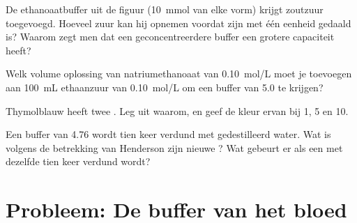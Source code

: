 \begin{exercise}[$\star\star\star$]\label{exo:g12:buffers-predominance:12}
De ethanoaatbuffer uit de figuur (\qty{10}{mmol} van elke vorm) krijgt
zoutzuur toegevoegd. Hoeveel zuur kan hij opnemen voordat zijn  met één
eenheid gedaald is? Waarom zegt men dat een geconcentreerdere buffer een
grotere capaciteit heeft?
\end{exercise}

\begin{exercise}[$\star\star\star$]\label{exo:g12:buffers-predominance:13}
Welk volume oplossing van natriumethanoaat van \qty{0.10}{mol/L} moet je
toevoegen aan \qty{100}{mL} ethaanzuur van \qty{0.10}{mol/L} om een buffer
van  5.0 te krijgen?
\end{exercise}

\begin{exercise}[$\star\star\star$]\label{exo:g12:buffers-predominance:14}
Thymolblauw heeft twee . Leg uit waarom, en geef de kleur
ervan bij  1, 5 en 10.
\end{exercise}

\begin{exercise}[$\star\star\star$]\label{exo:g12:buffers-predominance:15}
Een buffer van  4.76 wordt tien keer verdund met gedestilleerd water.
Wat is volgens de betrekking van Henderson zijn nieuwe ? Wat gebeurt er
als een  met dezelfde  tien keer verdund wordt?
\end{exercise}

\section{Probleem: De buffer van het bloed}

